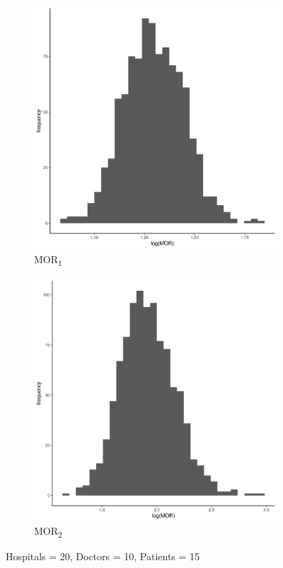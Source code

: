 \documentclass[
  letterpaper,
  DIV=11,
  numbers=noendperiod,
  titlepage]{scrartcl}
\begin{document}
\vspace{10mm}

\begin{figure}
\centering
\begin{subfigure}{.49\textwidth}
    \centering
    \includegraphics[width=.95\linewidth]{../../plots/three-lvl-ran-int/low-prev/hist_20_10_15_three_lvl_low_prev_mor1.png}  
    \caption{MOR\textsubscript{1}}
    \label{l20m10n151}
\end{subfigure}
\begin{subfigure}{.49\textwidth}
    \centering
    \includegraphics[width=.95\linewidth]{../../plots/three-lvl-ran-int/low-prev/hist_20_10_15_three_lvl_low_prev_mor2.png}  
    \caption{MOR\textsubscript{2}}
    \label{l20m10n152}
\end{subfigure}
\caption{Hospitals = 20, Doctors = 10, Patients = 15}
\label{mor1}
\end{figure}
\end{document}
